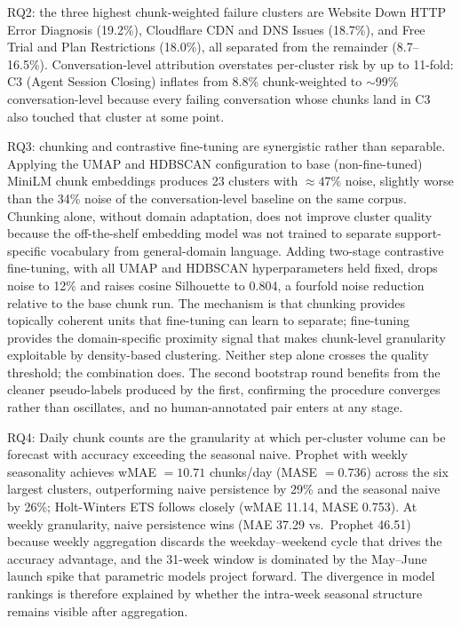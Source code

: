 \documentclass[conference]{IEEEtran}
\begin{document}
RQ2: the three highest chunk-weighted failure clusters are Website Down HTTP Error Diagnosis (19.2\%), Cloudflare CDN and DNS Issues (18.7\%), and Free Trial and Plan Restrictions (18.0\%), all separated from the remainder (8.7--16.5\%). Conversation-level attribution overstates per-cluster risk by up to 11-fold: C3 (Agent Session Closing) inflates from 8.8\% chunk-weighted to ${\sim}$99\% conversation-level because every failing conversation whose chunks land in C3 also touched that cluster at some point.

RQ3: chunking and contrastive fine-tuning are synergistic rather than separable. Applying the UMAP and HDBSCAN configuration to base (non-fine-tuned) MiniLM chunk embeddings produces 23 clusters with ${\approx}47\%$ noise, slightly worse than the 34\% noise of the conversation-level baseline on the same corpus. Chunking alone, without domain adaptation, does not improve cluster quality because the off-the-shelf embedding model was not trained to separate support-specific vocabulary from general-domain language. Adding two-stage contrastive fine-tuning, with all UMAP and HDBSCAN hyperparameters held fixed, drops noise to 12\% and raises cosine Silhouette to 0.804, a fourfold noise reduction relative to the base chunk run. The mechanism is that chunking provides topically coherent units that fine-tuning can learn to separate; fine-tuning provides the domain-specific proximity signal that makes chunk-level granularity exploitable by density-based clustering. Neither step alone crosses the quality threshold; the combination does. The second bootstrap round benefits from the cleaner pseudo-labels produced by the first, confirming the procedure converges rather than oscillates, and no human-annotated pair enters at any stage.

RQ4: Daily chunk counts are the granularity at which per-cluster volume can be forecast with accuracy exceeding the seasonal naive. Prophet with weekly seasonality achieves wMAE $= 10.71$ chunks/day (MASE $= 0.736$) across the six largest clusters, outperforming naive persistence by 29\% and the seasonal naive by 26\%; Holt-Winters ETS follows closely (wMAE 11.14, MASE 0.753). At weekly granularity, naive persistence wins (MAE 37.29 vs.\ Prophet 46.51) because weekly aggregation discards the weekday--weekend cycle that drives the accuracy advantage, and the 31-week window is dominated by the May--June launch spike that parametric models project forward. The divergence in model rankings is therefore explained by whether the intra-week seasonal structure remains visible after aggregation.
\end{document}
